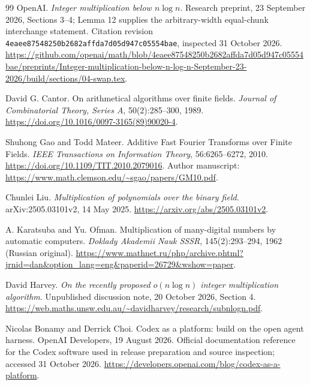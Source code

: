 \begin{thebibliography}{99}
OpenAI.
\newblock \emph{Integer multiplication below $n\log n$}.
\newblock Research preprint, 23 September 2026, Sections 3--4;
Lemma 12 supplies the arbitrary-width equal-chunk interchange statement.
\newblock Citation revision \texttt{4eaee87548250b2682affda7d05d947c05554bae}, inspected 31 October 2026.
\newblock \url{https://github.com/openai/math/blob/4eaee87548250b2682affda7d05d947c05554bae/preprints/Integer-multiplication-below-n-log-n-September-23-2026/build/sections/04-swap.tex}.

David G. Cantor.
\newblock On arithmetical algorithms over finite fields.
\newblock \emph{Journal of Combinatorial Theory, Series A}, 50(2):285--300, 1989.
\newblock \url{https://doi.org/10.1016/0097-3165(89)90020-4}.

Shuhong Gao and Todd Mateer.
\newblock Additive Fast Fourier Transforms over Finite Fields.
\newblock \emph{IEEE Transactions on Information Theory}, 56:6265--6272, 2010.
\newblock \url{https://doi.org/10.1109/TIT.2010.2079016}.
\newblock Author manuscript: \url{https://www.math.clemson.edu/~sgao/papers/GM10.pdf}.

Chunlei Liu.
\newblock \emph{Multiplication of polynomials over the binary field}.
\newblock arXiv:2505.03101v2, 14 May 2025.
\newblock \url{https://arxiv.org/abs/2505.03101v2}.

A. Karatsuba and Yu. Ofman.
\newblock Multiplication of many-digital numbers by automatic computers.
\newblock \emph{Doklady Akademii Nauk SSSR}, 145(2):293--294, 1962
(Russian original).
\newblock \url{https://www.mathnet.ru/php/archive.phtml?jrnid=dan&option_lang=eng&paperid=26729&wshow=paper}.

David Harvey.
\newblock \emph{On the recently proposed $o(n\log n)$ integer multiplication algorithm}.
\newblock Unpublished discussion note, 20 October 2026, Section 4.
\newblock \url{https://web.maths.unsw.edu.au/~davidharvey/research/subnlogn.pdf}.

Nicolas Bonamy and Derrick Choi.
\newblock Codex as a platform: build on the open agent harness.
\newblock OpenAI Developers, 19 August 2026. Official documentation
reference for the Codex software used in release preparation and source
inspection; accessed 31 October 2026.
\newblock \url{https://developers.openai.com/blog/codex-as-a-platform}.

\end{thebibliography}
\endgroup
